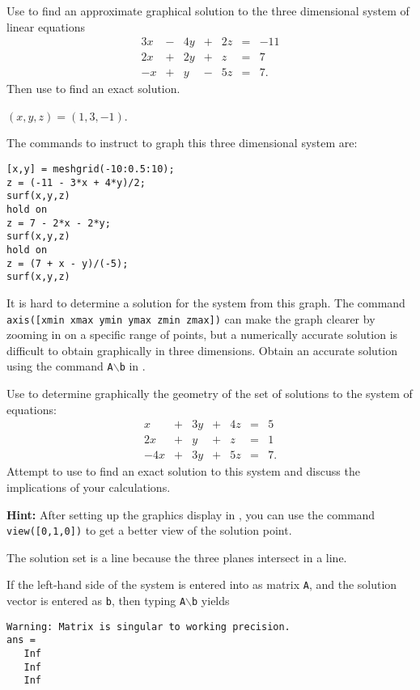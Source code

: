 \documentclass{ximera}
\begin{document}
\begin{exercise} \label{c2.2.3}
Use \Matlab to find an approximate graphical solution to the
three dimensional system of linear equations
\[
\begin{array}{rcrcrcr}
 3x & - & 4y & + & 2z  & = & -11\\
 2x & + & 2y & + &  z  & = &   7\\
 -x & + &  y & - & 5z  & = &   7.
\end{array}
\]
Then use \Matlab to find an exact solution.

\begin{solution}

\ans $(x,y,z) = (1,3,-1)$.

\soln The commands to instruct \Matlab to graph this three dimensional
system are:
\begin{verbatim}
[x,y] = meshgrid(-10:0.5:10);
z = (-11 - 3*x + 4*y)/2;
surf(x,y,z)
hold on 
z = 7 - 2*x - 2*y;
surf(x,y,z)
hold on
z = (7 + x - y)/(-5);
surf(x,y,z)
\end{verbatim}
It is hard to determine a solution for the system from this graph.
The command {\tt axis([xmin xmax ymin ymax zmin zmax])} can make the
graph clearer by zooming in on a specific range of points, but a
numerically accurate solution is difficult to obtain graphically in
three dimensions.  Obtain an accurate solution using the command
{\tt A}$\backslash${\tt b} in \Matlabp.

\end{solution}
\end{exercise}


\begin{exercise} \label{c2.2.4}
Use \Matlab to determine graphically the geometry of the set of
solutions to the system of equations:
\[
\begin{array}{rcrcrcr}
  x & + & 3y & + & 4z  & = & 5\\
 2x & + &  y & + &  z  & = & 1\\
-4x & + & 3y & + & 5z  & = & 7.
\end{array}
\]
Attempt to use \Matlab to find an exact solution to this system
and discuss the implications of your calculations.

{\bf Hint:} After setting up the graphics display in \Matlabp,
you can use the command {\tt view([0,1,0])}  to get
a better view of the solution point.

\begin{solution}

\ans The solution set is a line because the three planes intersect in a line.

\soln If the left-hand side of the system is entered into \Matlab as
matrix {\tt A}, and the solution vector is entered as {\tt b}, then
typing {\tt A}$\backslash${\tt b} yields
\begin{verbatim}
Warning: Matrix is singular to working precision.
ans =
   Inf
   Inf
   Inf
\end{verbatim}

\end{solution}
\end{exercise}
\end{document}
